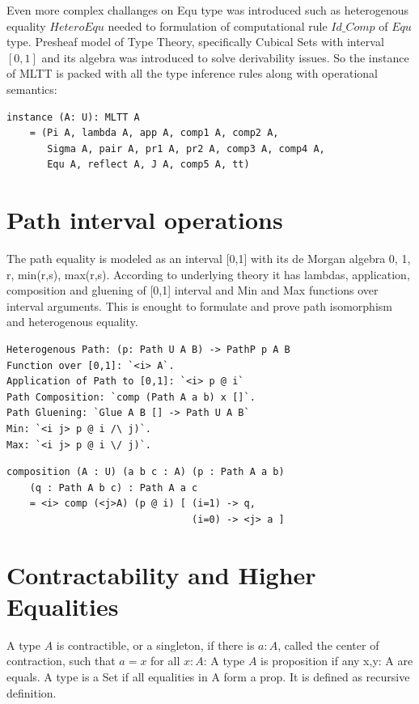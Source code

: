 \documentclass{svproc}
\begin{document}
Even more complex challanges on Equ type was introduced such
as heterogenous equality $HeteroEqu$ needed to formulation
of computational rule $Id\_Comp$ of $Equ$ type. Presheaf model of Type Theory, specifically
Cubical Sets with interval $[0,1]$ and
its algebra was introduced to solve derivability issues. So the instance of MLTT is packed
with all the type inference rules along with operational semantics:

\begin{lstlisting}[mathescape=true]
instance (A: U): MLTT A
    = (Pi A, lambda A, app A, comp1 A, comp2 A,
       Sigma A, pair A, pr1 A, pr2 A, comp3 A, comp4 A,
       Equ A, reflect A, J A, comp5 A, tt)
\end{lstlisting}

\newpage
\section{Path interval operations}

The path equality is modeled as an interval [0,1] with
its de Morgan algebra 0, 1, r, min(r,s), max(r,s). According to underlying theory
it has lambdas, application, composition and gluening of [0,1] interval and Min and Max
functions over interval arguments. This is enought to formulate and prove path
isomorphism and heterogenous equality.

\begin{lstlisting}[mathescape=true]
Heterogenous Path: (p: Path U A B) -> PathP p A B
Function over [0,1]: `<i> A`.
Application of Path to [0,1]: `<i> p @ i`
Path Composition: `comp (Path A a b) x []`.
Path Gluening: `Glue A B [] -> Path U A B`
Min: `<i j> p @ i /\ j)`.
Max: `<i j> p @ i \/ j)`.
\end{lstlisting}

\begin{lstlisting}[mathescape=true]
composition (A : U) (a b c : A) (p : Path A a b)
    (q : Path A b c) : Path A a c
    = <i> comp (<j>A) (p @ i) [ (i=1) -> q,
                                (i=0) -> <j> a ]
\end{lstlisting}

\section{Contractability and Higher Equalities}

A type $A$ is contractible, or a singleton, if there is $a : A$,
called the center of contraction, such that $a = x$ for all $x : A$:
A type $A$ is proposition if any x,y: A are equals.
A type is a Set if all equalities in A form a prop.
It is defined as recursive definition.
\end{document}
